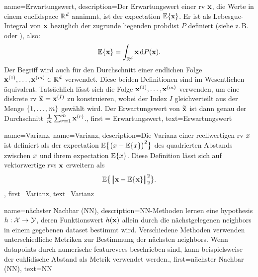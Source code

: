 {{{
{
	name=Erwartungswert,
	description={Der  Erwartungswert einer \gls{rv} ${\bf x}$, 
		die Werte in einem \gls{euclidspace} $\mathbb{R}^{d}$ annimmt, ist der 
		\gls{expectation} $\mathbb{E}\{{\bf x}\}$. Er ist als Lebesgue-Integral von 
		${\bf x}$ bezüglich der zugrunde liegenden \gls{probdist} $P$ definiert (siehe z.\,B. \cite{BillingsleyProbMeasure} oder \cite{RudinBookPrinciplesMatheAnalysis}), also:
		\[
		\mathbb{E}\{{\bf x}\} = \int_{\mathbb{R}^{d}} {\bf x} \, \mathrm{d}P({\bf x}).
		\]
		Der Begriff wird auch für den Durchschnitt einer endlichen Folge 
		${\bf x}^{(1)}, \ldots, {\bf x}^{(m)} \in \mathbb{R}^{d}$ verwendet. 
		Diese beiden Definitionen sind im Wesentlichen äquivalent. Tatsächlich lässt sich 
		die Folge ${\bf x}^{(1)}, \ldots, {\bf x}^{(m)}$ verwenden, um eine diskrete 
		\gls{rv} $\widetilde{{\bf x}} = {\bf x}^{(I)}$ zu konstruieren, wobei der Index $I$ 
		gleichverteilt aus der Menge $\{1, \ldots, m\}$ gewählt wird. 
		Der Erwartungswert von $\widetilde{{\bf x}}$ ist dann genau der Durchschnitt 
		$\frac{1}{m} \sum_{r=1}^{m} {\bf x}^{(r)}$.},
	first = {Erwartungswert}, text={Erwartungswert} 
}

{
	name={Varianz},
	name=Varianz,
	description={Die  Varianz einer reellwertigen \gls{rv} $x$ ist definiert als der 
		\gls{expectation} $\mathbb{E}\big\{ \big( x - \mathbb{E}\{x \} \big)^{2} \big\}$ des quadrierten Abstands zwischen 
		$x$ und ihrem \gls{expectation} $\mathbb{E}\{x \}$. Diese Definition lässt sich auf vektorwertige 
		\gls{rv}s ${\bf x}$ erweitern als 
		\[
		\mathbb{E}\big\{ \big\| {\bf x} - \mathbb{E}\{{\bf x} \} \big\|_{2}^{2} \big\}.
		\]
	}, 
	first={Varianz}, text={Varianz} 
}

{
	name={nächster Nachbar (NN)},
	description={NN-Methoden lernen eine \gls{hypothesis} 
		$h: \mathcal{X} \rightarrow \mathcal{Y}$, deren Funktionswert $h({\bf x})$ 
		allein durch die nächstgelegenen \gls{neighbors} in einem gegebenen \gls{dataset} bestimmt wird. 
		Verschiedene Methoden verwenden unterschiedliche Metriken zur Bestimmung der nächsten 
		\gls{neighbors}. Wenn \gls{datapoint}s durch numerische \gls{featurevec}s beschrieben sind, 
		kann beispielsweise der euklidische Abstand als Metrik verwendet werden.},
	first={nächster Nachbar (NN)}, text={NN}
}

}}}
